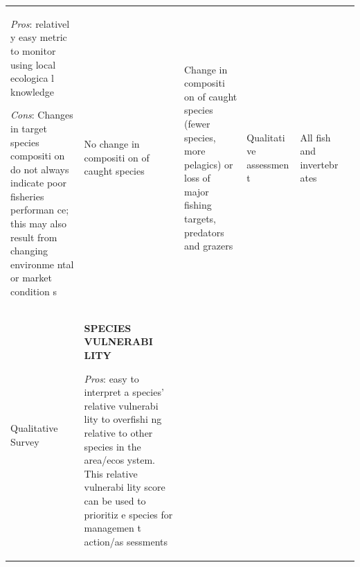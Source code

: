 \documentclass[]{book}
\begin{document}
\begin{longtable}[]{@{}llllll@{}}
\begin{minipage}[t]{0.16\columnwidth}
\emph{Pros}: relativel y easy metric to monitor using local ecologica l
knowledge

\emph{Cons}: Changes in target species compositi on do not always
indicate poor fisheries performan ce; this may also result from changing
environme ntal or market condition s\strut
\end{minipage} & \begin{minipage}[t]{0.16\columnwidth}\raggedright\strut
No change in compositi on of caught species\strut
\end{minipage} & \begin{minipage}[t]{0.16\columnwidth}\raggedright\strut
Change in compositi on of caught species (fewer species, more pelagics)
or loss of major fishing targets, predators and grazers\strut
\end{minipage} & \begin{minipage}[t]{0.16\columnwidth}\raggedright\strut
Qualitati ve assessmen t\strut
\end{minipage} & \begin{minipage}[t]{0.16\columnwidth}\raggedright\strut
All fish and invertebr ates\strut
\end{minipage}\tabularnewline
\begin{minipage}[t]{0.16\columnwidth}\raggedright\strut
Qualitative Survey\strut
\end{minipage} & \begin{minipage}[t]{0.16\columnwidth}\raggedright\strut
\textbf{SPECIES VULNERABI LITY}

\emph{Pros}: easy to interpret a species' relative vulnerabi lity to
overfishi ng relative to other species in the area/ecos ystem. This
relative vulnerabi lity score can be used to prioritiz e species for
managemen t action/as sessments


\end{minipage}
\end{longtable}
\end{document}
